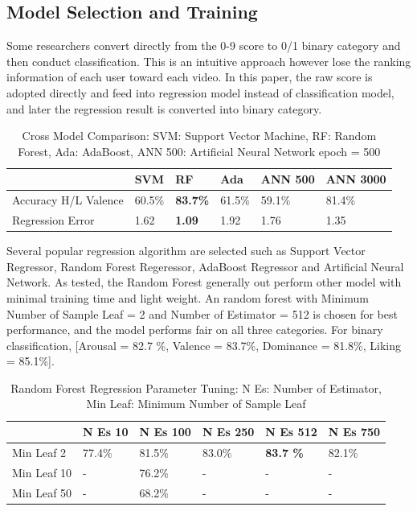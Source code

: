 \documentclass[a4paper]{article}
\begin{document}
\subsection{Model Selection and Training}

Some researchers convert directly from the 0-9 score to 0/1 binary category and then conduct classification. This is an intuitive approach however lose the ranking information of each user toward each video. In this paper, the raw score is adopted directly and feed into regression model instead of classification model, and later the regression result is converted into binary category. 

\begin{table}[]
\begin{tabular}{llllll}
\hline
& SVM & RF & Ada & ANN 500 & ANN 3000 \\ \hline
Accuracy H/L Valence & 60.5\%                 & \textbf{83.7\%}         & 61.5\%   & 59.1\%         & 81.4\%          \\
Regression Error          & 1.62                   & \textbf{1.09}          & 1.92     & 1.76           & 1.35 \\ \hline           
\end{tabular}
\caption{Cross Model Comparison: SVM: Support Vector Machine, RF: Random Forest, Ada: AdaBoost, ANN 500: Artificial Neural Network epoch = 500}
\end{table}

Several popular regression algorithm are selected such as Support Vector Regressor, Random Forest Regeressor, AdaBoost Regressor and Artificial Neural Network. As tested, the Random Forest generally out perform other model with minimal training time and light weight. An random forest with Minimum Number of Sample Leaf = 2 and Number of Estimator = 512 is chosen for best performance, and the model performs fair on all three categories. For binary classification, [Arousal = 82.7 \%, Valence = 83.7\%, Dominance = 81.8\%, Liking = 85.1\%].

\begin{table}[]
\begin{tabular}{llllll}
\hline
            & N Es 10   & N Es 100  & N Es 250  & N Es 512  & N Es 750  \\ \hline
Min Leaf 2  & 77.4\% & 81.5\% & 83.0\% & \textbf{83.7 \%} & 82.1\% \\ 
Min Leaf 10 & -      & 76.2\% & -      & -      & -      \\
Min Leaf 50 & -      & 68.2\% & -      & -      & -     \\\hline
\end{tabular}
\caption{Random Forest Regression Parameter Tuning: N Es: Number of Estimator, Min Leaf: Minimum Number of Sample Leaf}
\end{table}
\end{document}
